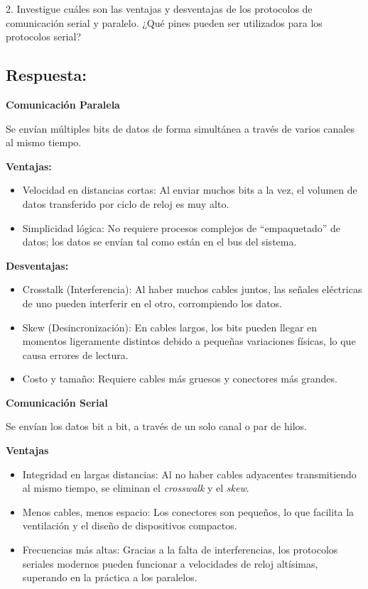 \documentclass[letterpaper, 12pt]{article}
\begin{document}
\newpage

2. Investigue cuáles son las ventajas y desventajas de los protocolos de comunicación serial y paralelo. ¿Qué pines pueden ser utilizados para los protocolos serial?

\subsection*{\small\textbf{Respuesta:}}

{\small\textbf{Comunicación Paralela}}

Se envían múltiples bits de datos de forma simultánea a través de varios canales al mismo tiempo.

{\footnotesize\textbf{Ventajas:}}

\begin{itemize}
    \item Velocidad en distancias cortas: Al enviar muchos bits a la vez, el volumen de datos transferido por ciclo de reloj es muy alto.
    \item Simplicidad lógica: No requiere procesos complejos de ``empaquetado'' de datos; los datos se envían tal como están en el bus del sistema.
\end{itemize}

{\footnotesize\textbf{Desventajas:}}

\begin{itemize}
    \item Crosstalk (Interferencia): Al haber muchos cables juntos, las señales eléctricas de uno pueden interferir en el otro, corrompiendo los datos.
    \item Skew (Desincronización): En cables largos, los bits pueden llegar en momentos ligeramente distintos debido a pequeñas variaciones físicas, lo que causa errores de lectura.
    \item Costo y tamaño: Requiere cables más gruesos y conectores más grandes.
\end{itemize}

{\small\textbf{Comunicación Serial}}

Se envían los datos bit a bit, a través de un solo canal o par de hilos.

{\footnotesize\textbf{Ventajas}}

\begin{itemize}
    \item Integridad en largas distancias: Al no haber cables adyacentes transmitiendo al mismo tiempo, se eliminan el \textit{crosswalk} y el \textit{skew}.
    \item Menos cables, menos espacio: Los conectores son pequeños, lo que facilita la ventilación y el diseño de dispositivos compactos.
    \item Frecuencias más altas: Gracias a la falta de interferencias, los protocolos seriales modernos pueden funcionar a velocidades de reloj altísimas, superando en la práctica a los paralelos.
\end{itemize}
\end{document}
